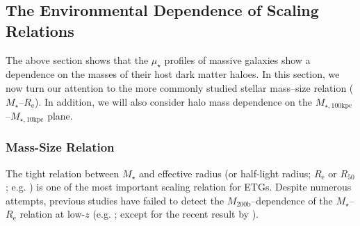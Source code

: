 \documentclass[a4paper,fleqn,usenatbib]{mnras}
\def\mstar{{$M_{\star}$}}
\def\mhalo{{$M_{\mathrm{200b}}$}}
\def\minn{{$M_{\star,10\mathrm{kpc}}$}}
\def\mtot{{$M_{\star,100\mathrm{kpc}}$}}
\def\mden{{$\mu_{\star}$}}
\begin{document}

\subsection{The Environmental Dependence of Scaling Relations}
    \label{ssec:scaling}
    
    The above section shows that the \mden{} profiles of massive galaxies show a 
    dependence on the masses of their host dark matter haloes. 
    In this section, we now turn our attention to the more commonly studied stellar 
    mass--size relation (\mstar{}--$R_{\mathrm{e}}$). 
    In addition, we will also consider halo mass dependence on the 
    \mtot{}--\minn{} plane. 
    
\subsubsection{Mass-Size Relation}
    \label{sssec:mass_size}
    
    The tight relation between \mstar{} and effective radius (or half-light radius; 
    $R_{\mathrm{e}}$ or $R_{\mathrm{50}}$; e.g. \citealt{Shankar2013, Leja2013, 
    vdWel2014}) is one of the most important scaling relation for ETGs. 
    Despite numerous attempts, previous studies have failed to detect the 
    \mhalo{}--dependence of the \mstar{}--$R_{\mathrm{e}}$ relation at low-$z$ 
    (e.g. \citealt{Weinmann2009, Nair2010, HCompany13, Cerbrian2014}; 
    except for the recent result by \citealt{Yoon2017}). 
    
\end{document}
